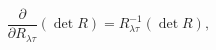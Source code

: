 \begin{equation}\label{det}
     \frac{\partial}{\partial R_{{\lambda}{\tau}}}(\det R)
     =R^{-1}_{{\lambda}{\tau}}(\det R),
\end{equation}

